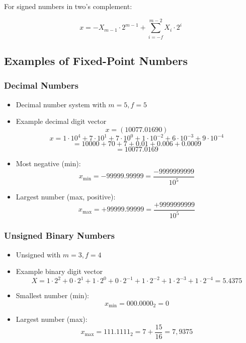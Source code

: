 \documentclass[12pt,openany]{book}
\begin{document}
		\vskip 0.5cm
		For signed numbers in two's complement:
		
		\[ x = -X_{m-1} \cdot 2^{m-1} + \sum_{i=-f}^{m-2} X_i \cdot 2^i \]
		
		\newpage
		\subsection{Examples of Fixed-Point Numbers}
		\subsubsection{ Decimal Numbers}
		
		\begin{itemize}
			\item[] Decimal number system with \( m = 5, f = 5 \)
			\item[] Example decimal digit vector
			      \[
			      	x = (10077.01690)
			      \]
			      \[
			      	x = 1 \cdot 10^4 + 7 \cdot 10^1 + 7 \cdot 10^0 + 1 \cdot 10^{-2} + 6 \cdot 10^{-3} + 9 \cdot 10^{-4}
			      \]
			      \[
			      	= 10000 + 70 + 7 + 0.01 + 0.006 + 0.0009
			      \]
			      \[
			      	= 10077.0169
			      \]
			\item[] Most negative (min):
			      \[
			      	x_{\text{min}} = -99999.99999 = \frac{-9999999999}{10^5}
			      \]
			\item[] Largest number (max, positive):
			      \[
			      	x_{\text{max}} = +99999.99999 = \frac{+9999999999}{10^5}
			      \]
		\end{itemize}
		
		\subsubsection{Unsigned Binary Numbers}
		
		\begin{itemize}
			\item[] Unsigned with \( m = 3, f = 4 \)
			\item[] Example binary digit vector
			      \[
			      	X = 1 \cdot 2^2 + 0 \cdot 2^1 + 1 \cdot 2^0 + 0 \cdot 2^{-1} + 1 \cdot 2^{-2} + 1 \cdot 2^{-3} + 1 \cdot 2^{-4} = 5.4375 \]
			      	
			      	\item[] Smallest number (min):
			      	\[
			      		x_{\text{min}} = 000.0000_2 = 0
			      	\]
			      	\item[] Largest number (max):
			      	\[
			      		x_{\text{max}} = 111.1111_2 = 7 + \frac{15}{16} = 7,9375
			      	\]
			      	\end{itemize}
			      	    
\end{document}
